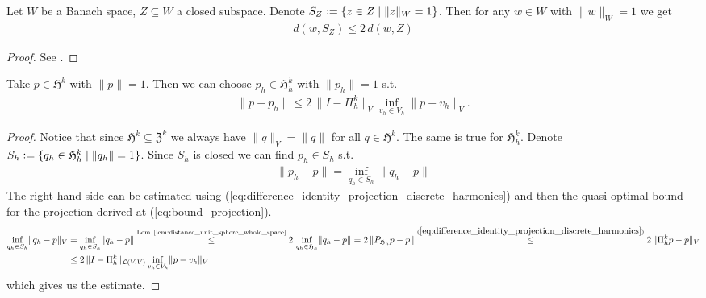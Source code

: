 \documentclass[../master_thesis.tex]{subfiles}
\begin{document}
\begin{lemma}\label{lem:distance_unit_sphere_whole_space}
    Let $W$ be a Banach space, $Z \subseteq W$ a closed subspace. Denote 
    $S_Z \vcentcolon= \{ z \in Z \mid \lVert z \rVert _W = 1 \}$. Then for 
    any $w \in W$ with $\lVert w \rVert _W = 1$ we get 
    \begin{align*}
        d(w,S_Z) \leq 2 \,d(w,Z)
    \end{align*}  
\end{lemma}
\begin{proof}
    See \cite[Ch.4 §2, (2.13)]{kato_perturbation_theory}.
\end{proof}

\begin{proposition}\label{prop:choice_of_discrete_harmonic_form}
    Take $p \in \mathfrak{H}^k$ with $\lVert p \rVert = 1$. Then we can 
    choose $p_h \in \mathfrak{H}_h^k$ with $\lVert p_h \rVert = 1$ s.t. 
    \begin{align*}
        \lVert p - p_h \rVert
        \leq 2\,\lVert I - \Pi_h^k\rVert _V \inf_{v_h \in V_h} \lVert p - v_h \rVert _V.
    \end{align*}
\end{proposition}
\begin{proof}
    Notice that since $\mathfrak{H}^k \subseteq \mathfrak{Z}^k$ we always have
    $\lVert q \rVert _V = \lVert q \rVert$ for all $q \in \mathfrak{H}^k$. The same is 
    true for $\mathfrak{H}^k_h$.
    Denote $S_h \vcentcolon= \{ q_h \in \mathfrak{H}^k_h \mid \lVert q_h \rVert = 1 \}$.
    Since $S_h$ is closed we can find $p_h \in S_h$ s.t. 
    \begin{align*}
        \lVert p_h - p \rVert = \inf_{q_h \in S_h} \lVert q_h - p \rVert
    \end{align*}
    The right hand side can be estimated using (\ref{eq:difference_identity_projection_discrete_harmonics}) 
    and then the 
    quasi optimal bound for the projection derived at (\ref{eq:bound_projection}).
    \begin{align*}
        \inf_{q_h \in S_h} \lVert q_h - p \rVert _V 
        &= \inf_{q_h \in S_h} \lVert q_h - p \rVert 
        \stackrel{\text{Lem.\,\ref{lem:distance_unit_sphere_whole_space}}}{\leq} 
            2\,\inf_{q_h \in \mathfrak{H}_h} \lVert q_h - p \rVert
        = 2\,\lVert P_{\mathfrak{H}_h}p - p \rVert
        \stackrel{(\ref{eq:difference_identity_projection_discrete_harmonics})}{\leq} 
            2\,\lVert \Pi_h^k p - p \rVert _V 
        \\ &\leq 2\,\lVert I - \Pi_h^k\rVert _{\mathcal{L}(V,V)}
            \inf_{v_h \in V_h} \lVert p - v_h \rVert _V
    \end{align*}
    which gives us the estimate.
\end{proof}
\end{document}
